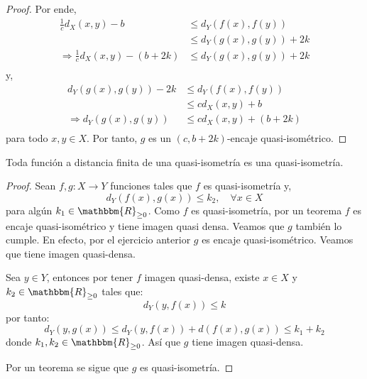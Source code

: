 \documentclass[12pt]{report}
\newcounter{it}
\theoremstyle{largebreak}
\newcommand\cf[3]{\ensuremath{#1:#2\rightarrow#3}}
\newcommand{\bbm}[1]{\ensuremath{\mathbbm{#1}}}
\begin{document}
\begin{proof}
        Por ende,
        \begin{equation*}
            \begin{split}
                \frac{1}{c}d_X(x,y)-b&\leq d_Y(f(x),f(y))\\
                &\leq d_Y(g(x),g(y))+2k\\
                \Rightarrow  \frac{1}{c}d_X(x,y)-(b+2k)&\leq d_Y(g(x),g(y))+2k\\
            \end{split}
        \end{equation*}
        y, 
        \begin{equation*}
            \begin{split}
                d_Y(g(x),g(y))-2k&\leq d_Y(f(x),f(y))\\
                &\leq cd_X(x,y)+b\\
                \Rightarrow d_Y(g(x),g(y))&\leq cd_X(x,y)+(b+2k)\\
            \end{split}
        \end{equation*}
        para todo $x,y\in X$. Por tanto, $g$ es un $(c,b+2k)$-encaje quasi-isométrico. 
    \end{proof}

    \begin{excer}
        Toda función a distancia finita de una quasi-isometría es una quasi-isometría.
    \end{excer}

    \begin{proof}
        Sean $\cf{f,g}{X}{Y}$ funciones tales que $f$ es quasi-isometría y,
        \begin{equation*}
            d_Y(f(x),g(x))\leq k_2,\quad\forall x\in X
        \end{equation*}
        para algún $k_1\in\bbm{R}_{\geq0}$. Como $f$ es quasi-isometría, por un teorema $f$ es encaje quasi-isométrico y tiene imagen quasi densa. Veamos que $g$ también lo cumple. En efecto, por el ejercicio anterior $g$ es encaje quasi-isométrico. Veamos que tiene imagen quasi-densa.

        Sea $y\in Y$, entonces por tener $f$ imagen quasi-densa, existe $x\in X$ y $k_2\in\bbm{R}_{\geq0}$ tales que:
        \begin{equation*}
            d_Y(y,f(x))\leq k
        \end{equation*}
        por tanto:
        \begin{equation*}
            d_Y(y,g(x))\leq d_Y(y,f(x))+d(f(x),g(x))\leq k_1+k_2
        \end{equation*}
        donde $k_1,k_2\in\bbm{R}_{\geq0}$. Así que $g$ tiene imagen quasi-densa.

        Por un teorema se sigue que $g$ es quasi-isometría.
    \end{proof}
\end{document}
